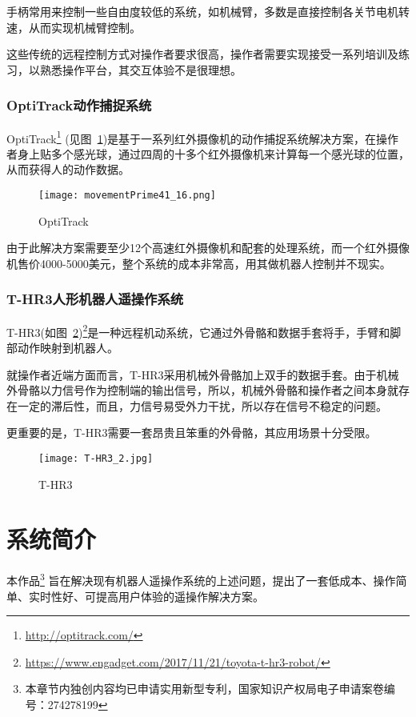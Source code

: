 手柄常用来控制一些自由度较低的系统，如机械臂，多数是直接控制各关节电机转速，从而实现机械臂控制。

这些传统的远程控制方式对操作者要求很高，操作者需要实现接受一系列培训及练习，以熟悉操作平台，其交互体验不是很理想。

\subsection{OptiTrack动作捕捉系统}
OptiTrack\footnote{\url{http://optitrack.com/}} (见图~\ref{opti})是基于一系列红外摄像机的动作捕捉系统解决方案，在操作者身上贴多个感光球，通过四周的十多个红外摄像机来计算每一个感光球的位置，从而获得人的动作数据。
\begin{figure}[H]
\small
\centering
\texttt{[image: movementPrime41\_16.png]}
\caption{OptiTrack} 
\label{opti}
\end{figure}
由于此解决方案需要至少12个高速红外摄像机和配套的处理系统，而一个红外摄像机售价4000-5000美元，整个系统的成本非常高，用其做机器人控制并不现实。

\subsection{T-HR3人形机器人遥操作系统}

T-HR3(如图~\ref{thr})\footnote{\url{https://www.engadget.com/2017/11/21/toyota-t-hr3-robot/}}是一种远程机动系统，它通过外骨骼和数据手套将手，手臂和脚部动作映射到机器人。

就操作者近端方面而言，T-HR3采用机械外骨骼加上双手的数据手套。由于机械外骨骼以力信号作为控制端的输出信号，所以，机械外骨骼和操作者之间本身就存在一定的滞后性，而且，力信号易受外力干扰，所以存在信号不稳定的问题。

更重要的是，T-HR3需要一套昂贵且笨重的外骨骼，其应用场景十分受限。

\begin{figure}[htbp]
\small
\centering
\texttt{[image: T-HR3\_2.jpg]}
\caption{T-HR3} 
\label{thr}
\end{figure}




\chapter{系统简介}
本作品\footnote{本章节内独创内容均已申请实用新型专利，国家知识产权局电子申请案卷编号：274278199}
旨在解决现有机器人遥操作系统的上述问题，提出了一套低成本、操作简单、实时性好、可提高用户体验的遥操作解决方案。


